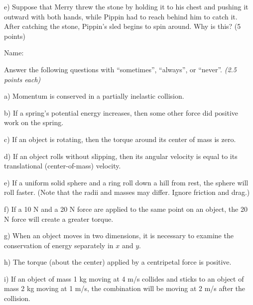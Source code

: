 \documentclass[12pt]{article}
\begin{document}
\vspace{1in}

e) Suppose that Merry threw the stone by holding it to his chest and pushing it outward with both hands, while Pippin had to reach behind him to catch it. After catching the stone, Pippin's sled begins to spin around. Why is this? (5 points)

\newpage


\begin{flushright}
Name: \underline{\hspace{3in}}
        \end{flushright}

        \Large \centerline{}
        \normalsize
        \rm

        Answer the following questions with ``sometimes'', ``always'', or ``never''. \it (2.5 points each)

\it \bigskip

a) Momentum is conserved in a partially inelastic collision.

\bigskip

b) If a spring's potential energy increases, then some other force did positive work on the spring.

\bigskip

c) If an object is rotating, then the torque around its center of mass is zero.

\bigskip

d) If an object rolls without slipping, then its angular velocity is equal to its translational (center-of-mass) velocity.

\bigskip

e) If a uniform solid sphere and a ring roll down a hill from rest, the sphere will roll faster. (Note that the radii and masses may differ. Ignore friction and drag.)

\bigskip

f) If a 10 N and a 20 N force are applied to the same point on an object, the 20 N force will create a greater torque. 

\bigskip

g) When an object moves in two dimensions, it is necessary to examine the conservation of energy separately in $x$ and $y$.

\bigskip

h) The torque (about the center) applied by a centripetal force is positive.

\bigskip

i) If an object of mass 1 kg moving at 4 m/s collides and sticks to an object of mass 2 kg moving at 1 m/s, the combination will be moving at 2 m/s after the collision.
\end{document}
